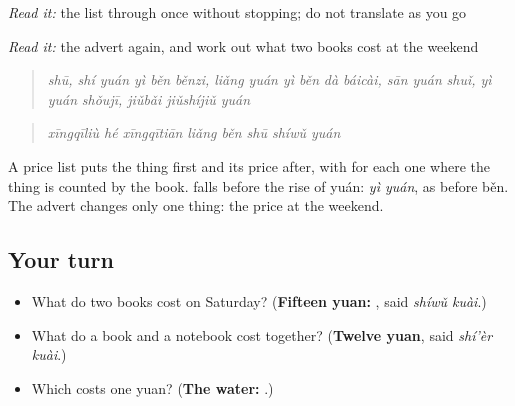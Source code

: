 \begin{tcolorbox}[breakable,skin=enhanced,colback=orange!6,colframe=orange!45!black,boxrule=0.5pt,arc=1mm,left=6pt,right=6pt,top=4pt,bottom=4pt,fonttitle=\bfseries,title={Read this}]
\begin{quote}
         
\end{quote}

\begin{quote}
 
\end{quote}

\emph{Read it:} the list through once without stopping; do not translate as you go

\emph{Read it:} the advert again, and work out what two books cost at the weekend
\end{tcolorbox}

\begin{tcolorbox}[breakable,skin=enhanced,colback=orange!6,colframe=orange!45!black,boxrule=0.5pt,arc=1mm,left=6pt,right=6pt,top=4pt,bottom=4pt,fonttitle=\bfseries,title={Read this}]
\begin{quote}
\emph{shū, shí yuán yì běn} \emph{běnzi, liǎng yuán yì běn} \emph{dà báicài, sān yuán} \emph{shuǐ, yì yuán} \emph{shǒujī, jiǔbǎi jiǔshíjiǔ yuán}
\end{quote}

\begin{quote}
\emph{xīngqīliù hé xīngqītiān} \emph{liǎng běn shū shíwǔ yuán}
\end{quote}

A price list puts the thing first and its price after, with  for each one where the thing is counted by the book.  falls before the rise of yuán: \emph{yì yuán}, as before běn. The advert changes only one thing: the price at the weekend.
\end{tcolorbox}

\subsection*{Your turn}
\begin{itemize}
\raggedright
  \item What do two books cost on Saturday? (\textbf{Fifteen yuan: }, said \emph{shíwǔ kuài}.)
  \item What do a book and a notebook cost together? (\textbf{Twelve yuan}, said \emph{shí'èr kuài}.)
  \item Which costs one yuan? (\textbf{The water:  }.)
\end{itemize}

